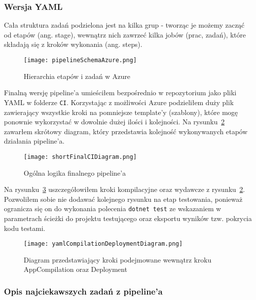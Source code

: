 \subsubsection{Wersja YAML}
Cała struktura zadań podzielona jest na kilka grup - tworząc je możemy zacząć od etapów (ang. stage), 
wewnątrz nich zawrzeć kilka jobów (prac, zadań), które składają się z kroków wykonania (ang. steps).

\begin{figure}[ht]
    \centering
    \texttt{[image: pipelineSchemaAzure.png]}
    \caption{Hierarchia etapów i zadań w Azure~\cite{pipelineSchemaAzure_source}}
    \label{img:pipelineSchemaAzure}
\end{figure}
Finalną wersję pipeline'a umieściłem bezpośrednio w repozytorium jako pliki YAML w folderze \verb|CI|.
Korzystając z możliwości Azure podzieliłem duży plik zawierający wszystkie kroki 
na pomniejsze template'y (szablony), które mogę ponownie wykorzystać w dowolnie dużej 
ilości i kolejności.
Na rysunku~\ref{img:shortFinalCIDiagram} zawarłem skrótowy diagram, który 
przedstawia kolejność wykonywanych etapów działania pipeline'a.

\begin{figure}[hb]
    \centering
    \texttt{[image: shortFinalCIDiagram.png]}
    \caption{Ogólna logika finalnego pipeline'a}
    \label{img:shortFinalCIDiagram}
\end{figure}

Na rysunku~\ref{img:yamlCompilationDeploymentDiagram} uszczegółowiłem kroki kompilacyjne 
oraz wydawcze z rysunku~\ref{img:shortFinalCIDiagram}. Pozwoliłem sobie nie dodawać kolejnego 
rysunku na etap testowania, ponieważ ogranicza się on do wykonania polecenia \verb|dotnet test|
ze wskazaniem w parametrach ścieżki do projektu testującego 
oraz eksportu wyników tzw. pokrycia kodu testami.

\begin{figure}[ht]
    \centering
    \texttt{[image: yamlCompilationDeploymentDiagram.png]}
    \caption{Diagram przedstawiający kroki podejmowane wewnątrz kroku AppCompilation oraz Deployment}
    \label{img:yamlCompilationDeploymentDiagram}
\end{figure}



\subsubsection{Opis najciekawszych zadań z pipeline'a}

